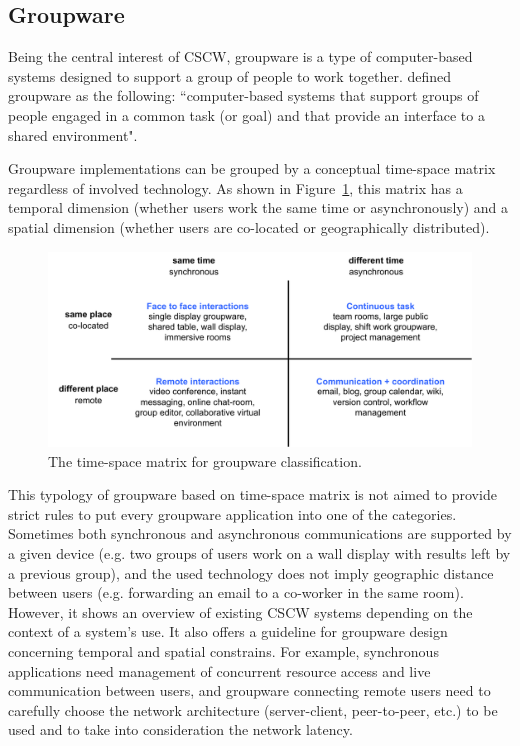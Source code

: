 \subsection{Groupware}
Being the central interest of CSCW, groupware is a type of computer-based systems designed to support a group of people to work together. \citet{Ellis1991Groupware} defined groupware as the following: ``computer-based systems that support groups of people engaged in a common task (or goal) and that provide an interface to a shared environment".

Groupware implementations can be grouped by a conceptual time-space matrix \citep{Johansen1988Groupware, Ellis1991Groupware} regardless of involved technology. As shown in Figure~\ref{fig:1_tsmatrix}, this matrix has a temporal dimension (whether users work the same time or asynchronously) and a spatial dimension (whether users are co-located or geographically distributed).

\begin{figure}[htb]
  \centering
  \includegraphics[width=\textwidth]{figures/ch1/tsmatrix}
  \caption{\label{fig:1_tsmatrix}The time-space matrix for groupware classification.}
\end{figure}

This typology of groupware based on time-space matrix is not aimed to provide strict rules to put every groupware application into one of the categories. Sometimes both synchronous and asynchronous communications are supported by a given device (e.g. two groups of users work on a wall display with results left by a previous group), and the used technology does not imply geographic distance between users (e.g. forwarding an email to a co-worker in the same room). However, it shows an overview of existing CSCW systems depending on the context of a system's use. It also offers a guideline for groupware design concerning temporal and spatial constrains. For example, synchronous applications need management of concurrent resource access and live communication between users, and groupware connecting remote users need to carefully choose the network architecture (server-client, peer-to-peer, etc.) to be used and to take into consideration the network latency.

